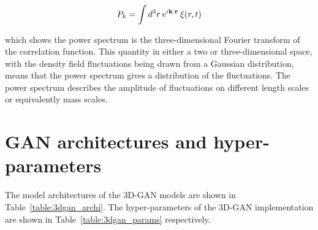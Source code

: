 \documentclass[twocolumn]{article}
\numberwithin{equation}{section}
\begin{document}
\begin{equation}
    P_k = \int d^3 r \: \textup{e}^{i\mathbf{k}\cdot\mathbf{r}} \: \xi(r,t)
\end{equation}

which shows the power spectrum is the three-dimensional Fourier transform of the correlation function. This quantity in either a two or three-dimensional space, with the density field fluctuations being drawn from a Gaussian distribution, means that the power spectrum gives a distribution of the fluctuations. The power spectrum describes the amplitude of fluctuations on different length scales or equivalently mass scales.

\section{GAN architectures and hyper-parameters}\label{appendix:gan_setups}

The model architectures of the 3D-GAN models are shown in Table~\ref{table:3dgan_archi}. The hyper-parameters of the 3D-GAN implementation are shown in Table~\ref{table:3dgan_params} respectively. 
\end{document}
